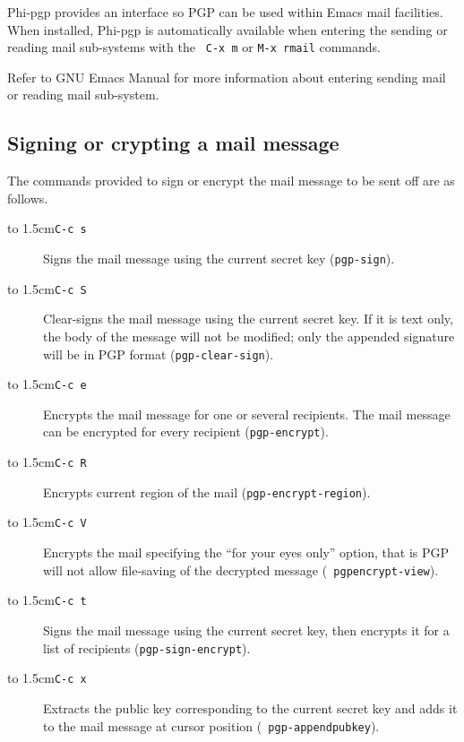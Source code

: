 Phi-pgp provides an interface so  PGP  can be  used within Emacs  mail
facilities.  When installed, Phi-pgp  is automatically  available when
entering the sending or reading mail sub-systems with the {\tt
C-x~m} or {\tt M-x~rmail} commands.

Refer to GNU Emacs Manual for  more information about entering sending
mail or reading mail sub-system.

\subsection{Signing or crypting a mail message}

The commands provided to  sign or encrypt the mail  message to be sent
off are as follows.

{\leftmargini 2cm %
\begin{description}
\item[\hbox to 1.5cm{\tt C-c  s\hfill}] 
Signs the mail message using the current secret key ({\tt pgp-sign}).

\item[\hbox to 1.5cm{\tt C-c  S\hfill}] 
Clear-signs the mail message using  the current secret  key. If it  is
text  only, the body  of  the message will not   be modified; only the
appended signature will be in PGP format ({\tt pgp-clear-sign}).

\item[\hbox to 1.5cm{\tt  C-c  e\hfill}]
Encrypts  the mail  message  for one  or several recipients.  The mail
message can be encrypted for every recipient ({\tt pgp-encrypt}).

\item[\hbox to 1.5cm{\tt C-c R\hfill}]   
Encrypts current region of the mail ({\tt pgp-encrypt-region}).

\item[\hbox to 1.5cm{\tt  C-c V\hfill}]  
Encrypts  the mail specifying the  ``for your eyes only'' option, that
is  PGP will not  allow  file-saving of  the  decrypted message ({\tt
pgp\-encrypt-view}).

\item[\hbox to 1.5cm{\tt C-c t\hfill}] 
Signs the mail message using the  current secret key, then encrypts it
for a list of recipients ({\tt pgp-sign-encrypt}).

 
\item[\hbox to 1.5cm{\tt C-c x\hfill}] 
Extracts  the public key corresponding to  the current  secret key and
adds   it  to   the     mail    message at  cursor     position ({\tt
pgp-append\-pubkey}).
\end{description}}

